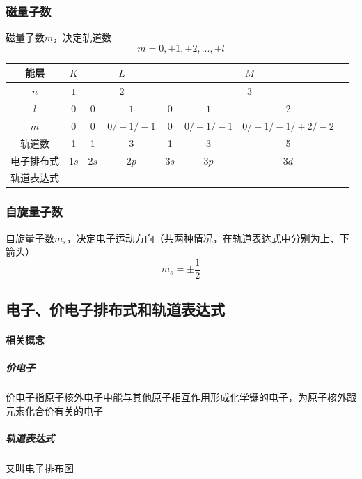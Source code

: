 \documentclass[a4paper]{article}
\begin{document}
	\subsubsection{磁量子数}
	磁量子数$m$，决定轨道数
	$$m=0,\pm1,\pm2,...,\pm l$$
	\begin{center}
	\begin{tabular}{|c|c|c|c|c|c|c|c|}
		\hline
		能层 & $K$ & \multicolumn{2}{c|}{$L$} & \multicolumn{3}{c|}{$M$}\\\hline
		$n$ & $1$ & \multicolumn{2}{c|}{$2$} & \multicolumn{3}{c|}{$3$}\\\hline
		$l$ & $0$ & $0$ & $1$ & $0$ & $1$ & $2$\\\hline
		$m$ & $0$ & $0$ & $0/+1/-1$ & $0$ & $0/+1/-1$ & $0/+1/-1/+2/-2$\\\hline
		轨道数 & 1 & 1 & 3 & 1 & 3 & 5\\\hline
		电子排布式 & $1s$ & $2s$ & $2p$ & $3s$ & $3p$ & $3d$\\\hline
		轨道表达式 & \fbox{$\ \ $} & \fbox{$\ \ $} & \fbox{$\ \ $}\fbox{$\ \ $}\fbox{$\ \ $} & \fbox{$\ \ $} & \fbox{$\ \ $}\fbox{$\ \ $}\fbox{$\ \ $} & \fbox{$\ \ $}\fbox{$\ \ $}\fbox{$\ \ $}\fbox{$\ \ $}\fbox{$\ \ $}\\\hline
	\end{tabular}
	\end{center}
	\subsubsection{自旋量子数}
	自旋量子数$m_s$，决定电子运动方向（共两种情况，在轨道表达式中分别为上、下箭头）
	$$m_s=\pm\frac12$$
	
	
	\subsection{电子、价电子排布式和轨道表达式}
	\paragraph{相关概念}
	\subparagraph{价电子}
	价电子指原子核外电子中能与其他原子相互作用形成化学键的电子，为原子核外跟元素化合价有关的电子
	\subparagraph{轨道表达式}
	又叫电子排布图
\end{document}

